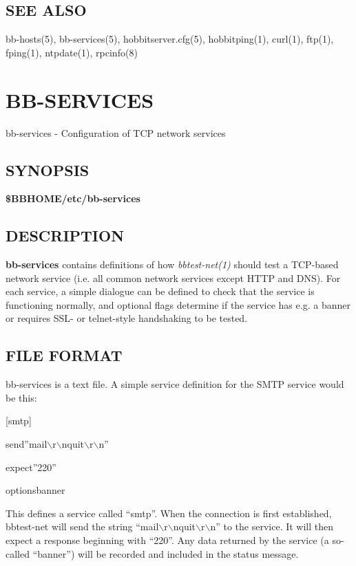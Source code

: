 \subsection{SEE ALSO}
bb-hosts(5), bb-services(5), hobbitserver.cfg(5), hobbitping(1), curl(1), ftp(1), fping(1), ntpdate(1), rpcinfo(8) 


%
\newpage
\section{BB-SERVICES}

 bb-services - Configuration of TCP network services 

 
\subsection{SYNOPSIS}
\textbf{\$BBHOME/etc/bb-services}


 
\subsection{DESCRIPTION}
\textbf{bb-services}
 contains definitions of how \emph{bbtest-net(1)}
 should test a TCP-based network service (i.e. all common network services except HTTP and DNS). For each service, a simple dialogue can be defined to check that the service is functioning normally, and optional flags determine if the service has e.g. a banner or requires SSL- or telnet-style handshaking to be tested. 

 
\subsection{FILE FORMAT}
 bb-services is a text file. A simple service definition for the SMTP service would be this:  


  
[smtp]  
 
send''mail$\backslash$r$\backslash$nquit$\backslash$r$\backslash$n''  
 
expect''220''  
 
optionsbanner  



  This defines a service called ``smtp''. When the connection is first established, bbtest-net will send the string ``mail$\backslash$r$\backslash$nquit$\backslash$r$\backslash$n'' to the service. It will then expect a response beginning with ``220''. Any data returned by the service (a so-called ``banner'') will be recorded and included in the status message. 



